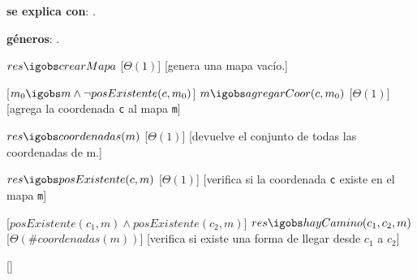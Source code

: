 \begin{Interfaz}


  \textbf{se explica con}: .

  \textbf{g\'eneros}: .



  {$res \igobs crearMapa$}%
  [$\Theta(1)$]
  [genera una mapa vac\'io.]


  [$m_0 \igobs m \land \lnot posExistente(c, m_0) $]  
  {$m \igobs agregarCoor(c, m_0)$}
  [$\Theta(1)$]
  [agrega la coordenada \texttt{c} al mapa \texttt{m}]


  {$res \igobs coordenadas(m)$}%
  [$\Theta(1)$]
  [devuelve el conjunto de todas las coordenadas de m.]


  {$res \igobs posExistente(c, m)$}
  [$\Theta(1)$]
  [verifica si la coordenada \texttt{c} existe en el mapa \texttt{m}]


  [$posExistente(c_1, m) \land posExistente(c_2, m) $]
  {$res \igobs hayCamino(c_1, c_2, m)$}
  [$\Theta(\# coordenadas(m))$]
  [verifica si existe una forma de llegar desde \texttt{$c_1$} a \texttt{$c_2$}]


\end{Interfaz}

\begin{Representacion}
 
  \begin{Estructura}{}[]
  \end{Estructura}


  

  \AbsFc[]{}

\end{Representacion}

\begin{Algoritmos}
  
\end{Algoritmos}